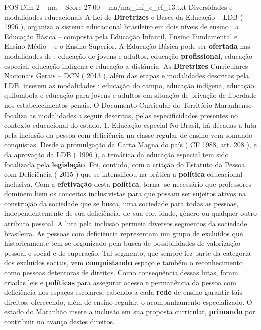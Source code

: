 \begin{textsample}{POS Dim 2 – ma – Score 27.00 – ma/ma\_inf\_e\_ef\_13.txt}  \label{ex:f2_pos_056}
Diversidades e modalidades educacionais A Lei de \textbf{Diretrizes} e Bases da Educação – LDB ( 1996 ), organiza o sistema educacional brasileiro em dois níveis de ensino : a Educação Básica – composta pela Educação Infantil, Ensino Fundamental e Ensino Médio – e o Ensino Superior.
A Educação Básica pode ser \textbf{ofertada} nas modalidades de : educação de jovens e adultos, educação \textbf{profissional}, educação especial, educação indígena e educação a distância.
As \textbf{Diretrizes} Curriculares Nacionais Gerais – DCN ( 2013 ), além das etapas e modalidades descritas pela LDB, inserem as modalidades : educação do campo, educação indígena, educação quilombola e educação para jovens e adultos em situação de privação de liberdade nos estabelecimentos penais.
O Documento Curricular do Território Maranhense focaliza as modalidades a seguir descritas, pelas especificidades presentes no contexto educacional do estado. 1.
Educação especial No Brasil, há décadas a luta pela inclusão da pessoa com deficiência na classe regular de ensino vem somando conquistas.
Desde a promulgação da Carta Magna do país ( CF 1988, art. 208 ), e da aprovação da LDB ( 1996 ), a temática da educação especial tem sido focalizada pela \textbf{legislação}.
Foi, contudo, com a criação do Estatuto da Pessoa com Deficiência ( 2015 ) que se intensificou na prática a \textbf{política} educacional inclusiva.
Com a \textbf{efetivação} desta \textbf{política}, torna -se necessário que professores dominem bem os conceitos inclusivistas para que possam ser sujeitos ativos na construção da sociedade que se busca, uma sociedade para todas as pessoas, independentemente de sua deficiência, de sua cor, idade, gênero ou qualquer outro atributo pessoal.
A luta pela inclusão permeia diversos segmentos da sociedade brasileira.
As pessoas com deficiência representam um grupo de excluídos que historicamente tem se organizado pela busca de possibilidades de valorização pessoal e social e de superação.
Tal segmento, que sempre fez parte da categoria dos excluídos sociais, vem \textbf{conquistando} espaço e também o reconhecimento como pessoas detentoras de direitos.
Como consequência dessas lutas, foram criadas leis e \textbf{políticas} para assegurar acesso e permanência da pessoa com deficiência nos espaços escolares, cabendo a cada \textbf{rede} de ensino garantir tais direitos, oferecendo, além de ensino regular, o acompanhamento especializado.
O estado do Maranhão insere a inclusão em sua proposta curricular, \textbf{primando} por contribuir no avanço destes direitos.

\end{textsample}
